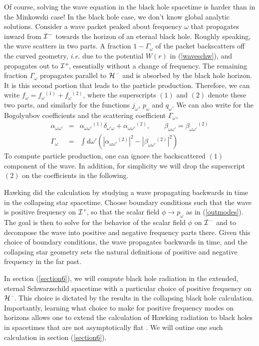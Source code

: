 \documentclass[12pt]{article}
\newcommand{\p}{\partial}
\def\bena{\begin{eqnarray}}
\def\eena{\end{eqnarray}}
\def\ph{{\cal H}^-}
\def\finf{{\cal I}^+}
\def\pinf{{\cal I}^-}
\def\f{f_{\omega}}
\def\p{p_{\omega}}
\def\q{q_{\omega}}
\def\j{j_{\omega}}
\def\alp{\alpha _{\omega \omega '}}
\def\bet{\beta_{\omega\omega '}}
\begin{document}
Of course, solving the wave equation in the black hole spacetime is
harder than in the Minkowski case!  In the black hole case, we don't know
global analytic
solutions. Consider a wave packet peaked about frequency $\omega$ that
propagates inward
from $\pinf$ towards the horizon of
an eternal black hole. Roughly speaking, the wave
scatters in two parts. A fraction $1-\Gamma _{\omega}$ of the packet
backscatters
off the  curved geometry, {\it i.e.} due to the potential $W(r)$ in
(\ref{waveschw}), and propagates
out to $\finf\!$, essentially without a change of frequency.
The remaining fraction $\Gamma _{\omega}$ propagates parallel to $\ph$ and
is absorbed by the black hole horizon. It is this second portion
that leads to the particle production.  Therefore, we can write
$\f=\f{}^{(1)}+\f{}^{(2)}$,
where the superscripts $(1)$ and $(2)$ denote these two parts, and
similarly for the
functions $\j$, $\p$ and $\q$.  We can also write for the Bogolyubov
coefficients and the
scattering coefficient $\Gamma_\omega$,
%
\bena\label{parts}\alp &=&\alp{}^{(1)} \delta_{\omega ' \omega}
+\alp{}^{(2)} ,\qquad
\bet =\bet {}^{(2)} \\
\Gamma_{\omega} &= &\int d\omega ' (|\alp {}^{(2)} |^2 - |\bet {}^{(2)}
|^2) \eena
%
To compute particle production, one can ignore the backscattered $(1)$
component of the wave.  In addition, for simplicity we will drop the
superscript $(2)$
on the coefficients in the following.

Hawking did the calculation by studying a wave propagating
backwards in time in the collapsing star spacetime.  Choose
boundary conditions such that the wave is positive frequency on $\finf\!$,
so that the scalar field $\phi\rightarrow\p$ as in (\ref{outmodes}).
The goal is then to solve for the behavior of the scalar field $\phi$ on
$\pinf$ and to decompose the wave into positive and negative frequency parts there.
Given this choice of boundary conditions, the wave propagates backwards in
time, and the collapsing star geometry sets the natural definitions
of positive and negative frequency in the far past.

In section (\ref{section6}), we will compute black hole radiation in the extended, eternal
Schwarzschild spacetime with a particular choice of positive frequency on $\ph\!$.
This choice is dictated by the results in the collapsing black hole calculation.
Importantly,
learning what choice to make for positive frequency modes on
horizons allows one to extend the calculation of Hawking radiation to black
holes
in spacetimes that are not asymptotically flat \cite{ktrnds}.  We will outine
one such calculation in section (\ref{section6}).
\end{document}
